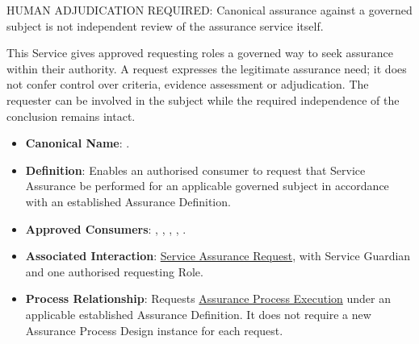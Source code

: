 HUMAN ADJUDICATION REQUIRED: Canonical assurance against a governed subject is not independent review of the assurance service itself.



This Service gives approved requesting roles a governed way to seek assurance within their authority. A request expresses the legitimate assurance need; it does not confer control over criteria, evidence assessment or adjudication. The requester can be involved in the subject while the required independence of the conclusion remains intact.



\begin{itemize}

\item
\textbf{Canonical Name}: \texttt{}.



\item
\textbf{Definition}: Enables an authorised consumer to request that Service Assurance be performed for an applicable governed subject in accordance with an established Assurance Definition.



\item
\textbf{Approved Consumers}: \texttt{}, \texttt{}, \texttt{}, \texttt{}, \texttt{}.



\item
\textbf{Associated Interaction}: \href{https://github.com/fhirfactory/harmonia/blob/98410db60155198a75f74c79d98060070209faa1/docs/markdown/03-business-architecture/collaborations-interactions/interactions.md\#service-assurance-request}{Service Assurance Request}, with Service Guardian and one authorised requesting Role.



\item
\textbf{Process Relationship}: Requests \href{https://github.com/fhirfactory/harmonia/blob/98410db60155198a75f74c79d98060070209faa1/docs/markdown/03-business-architecture/processes/business-processes.md\#assurance-process-execution}{Assurance Process Execution} under an applicable established Assurance Definition. It does not require a new Assurance Process Design instance for each request.




\end{itemize}
